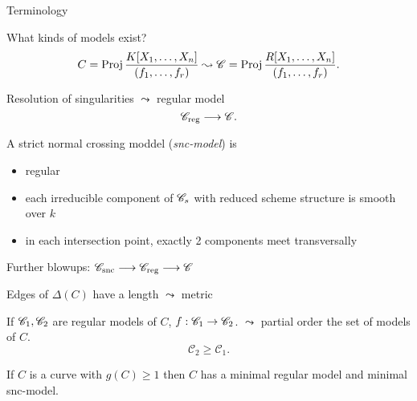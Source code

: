 \begin{frame}{Terminology}
\begin{figure}[ht]
    \centering
\end{figure}
\end{frame}


\begin{frame}
	What kinds of models exist?\[
		C = \operatorname{Proj} \frac{K[X_1, \ldots, X_n]}{(f_1, \ldots, f_r)}
		\leadsto \mathscr C = \operatorname{Proj} \frac{R[X_1, \ldots, X_n]}{(f_1, \ldots, f_r)}
	.\] 

	\pause
	Resolution of singularities $\leadsto $ regular model 
	\[
		\mathscr C _\text{reg}  \longrightarrow \mathscr C 
	.\]




\end{frame}
\begin{frame}
	\begin{definition}
		A strict normal crossing moddel (\emph{snc-model}) is 
		\begin{itemize}
			\item regular
			\item each irreducible component of $\mathscr C_s$ with reduced scheme structure is smooth over $k$
			\item in each intersection point, exactly 2 components meet transversally
		\end{itemize}
	\end{definition}
	Further blowups: $\mathscr {\mathscr C}_\text{snc} \longrightarrow \mathscr {\mathscr C}_\text{reg} \longrightarrow \mathscr {\mathscr C}$

\end{frame}


\begin{frame}
    Edges of $\Delta(C)$ have a length $\leadsto$ metric 
\end{frame}
\begin{frame}
	If $\mathscr C_1, \mathscr C_2$ are regular models of $C$, $f: \mathscr C_1 \to \mathscr C_2$.
	$\leadsto$ partial order the set of models of $C$. 
	\[
	\mathscr C_2 \ge \mathscr C_1
	.\] 

	\pause
\begin{theorem}
		If $C$ is a curve with $g(C) \ge 1$ then $C$ has a minimal regular model and minimal snc-model.
\end{theorem}
\end{frame}





